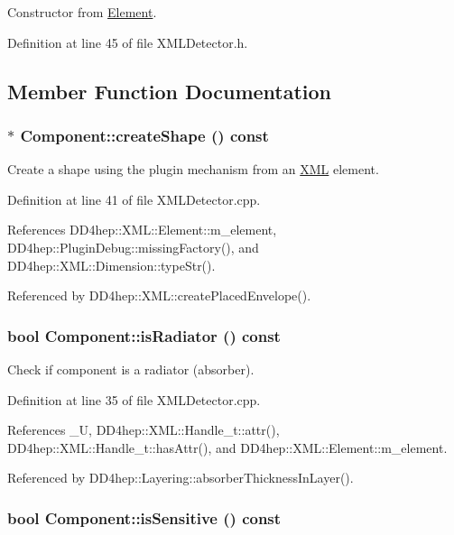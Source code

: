 Constructor from \hyperlink{class_d_d4hep_1_1_x_m_l_1_1_element}{Element}. 

Definition at line 45 of file XMLDetector.h.

\subsection{Member Function Documentation}
\hypertarget{struct_d_d4hep_1_1_x_m_l_1_1_component_a3725a2969dc1770e739ba3625bcd9a65}{
\subsubsection[{createShape}]{ $\ast$ Component::createShape () const}}
\label{struct_d_d4hep_1_1_x_m_l_1_1_component_a3725a2969dc1770e739ba3625bcd9a65}


Create a shape using the plugin mechanism from an \hyperlink{namespace_d_d4hep_1_1_x_m_l}{XML} element. 

Definition at line 41 of file XMLDetector.cpp.

References DD4hep::XML::Element::m\_\-element, DD4hep::PluginDebug::missingFactory(), and DD4hep::XML::Dimension::typeStr().

Referenced by DD4hep::XML::createPlacedEnvelope().\hypertarget{struct_d_d4hep_1_1_x_m_l_1_1_component_af904684407473701e1b9f1a895f80a15}{
\subsubsection[{isRadiator}]{\setlength{\rightskip}{0pt plus 5cm}bool Component::isRadiator () const}}
\label{struct_d_d4hep_1_1_x_m_l_1_1_component_af904684407473701e1b9f1a895f80a15}


Check if component is a radiator (absorber). 

Definition at line 35 of file XMLDetector.cpp.

References \_\-U, DD4hep::XML::Handle\_\-t::attr(), DD4hep::XML::Handle\_\-t::hasAttr(), and DD4hep::XML::Element::m\_\-element.

Referenced by DD4hep::Layering::absorberThicknessInLayer().\hypertarget{struct_d_d4hep_1_1_x_m_l_1_1_component_add2a9de5d5e29aca30402e080ae2ea44}{
\subsubsection[{isSensitive}]{\setlength{\rightskip}{0pt plus 5cm}bool Component::isSensitive () const}}
\label{struct_d_d4hep_1_1_x_m_l_1_1_component_add2a9de5d5e29aca30402e080ae2ea44}


